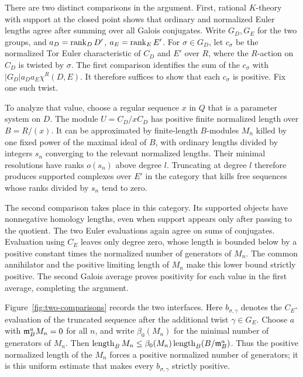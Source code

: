 There are two distinct comparisons in the argument. First, rational
$K$-theory with support at the closed point shows that ordinary and
normalized Euler lengths agree after summing over all Galois
conjugates. Write $G_D,G_E$ for the two groups, and
$a_D=\operatorname{rank}_D D'$, $a_E=\operatorname{rank}_E E'$. For $\sigma\in G_D$, let
$c_\sigma$ be the normalized Tor Euler characteristic of $C_D$ and
$E'$ over $R$, where the $R$-action on $C_D$ is twisted by $\sigma$.
The first comparison identifies the sum of the $c_\sigma$ with
$|G_D|a_Da_E\chi^R(D,E)$. It therefore suffices to show that
each $c_\sigma$ is positive. Fix one such twist.

To analyze that value, choose a regular sequence $x$ in $Q$ that is a
parameter system on $D$. The module $U=C_D/xC_D$ has positive finite
normalized length over $B=R/(x)$. It can be approximated by finite-length
$B$-modules $M_n$ killed by one fixed power of the maximal ideal of $B$,
with ordinary lengths
divided by integers $s_n$ converging to the relevant normalized lengths.
Their minimal resolutions have ranks $o(s_n)$ above degree $l$.
Truncating at degree $l$ therefore produces supported complexes over
$E'$ in the category that kills free sequences whose ranks divided by
$s_n$ tend to zero.

The second comparison takes place in this category. Its supported
objects have nonnegative homology lengths, even when support appears
only after passing to the quotient. The two Euler evaluations again
agree on sums of conjugates. Evaluation using $C_E$ leaves only degree
zero, whose length is bounded below by a positive constant times the
normalized number of generators of $M_n$. The common annihilator and
the positive limiting length of $M_n$ make this lower bound strictly
positive. The second Galois average proves positivity for each value
in the first average, completing the argument.

Figure~\ref{fig:two-comparisons} records the two interfaces. Here
$b_{\sigma,\gamma}$ denotes the $C_E$-evaluation of the truncated
sequence after the additional twist $\gamma\in G_E$. Choose $a$ with
$\mathfrak{m}_B^aM_n=0$ for all $n$, and write $\beta_0(M_n)$ for the minimal
number of generators of $M_n$. Then
$\operatorname{length}_B M_n\leq\beta_0(M_n)\operatorname{length}_B(B/\mathfrak{m}_B^a)$.
Thus the positive normalized length of the $M_n$ forces a positive
normalized number of generators; it is this uniform estimate that
makes every $b_{\sigma,\gamma}$ strictly positive.

